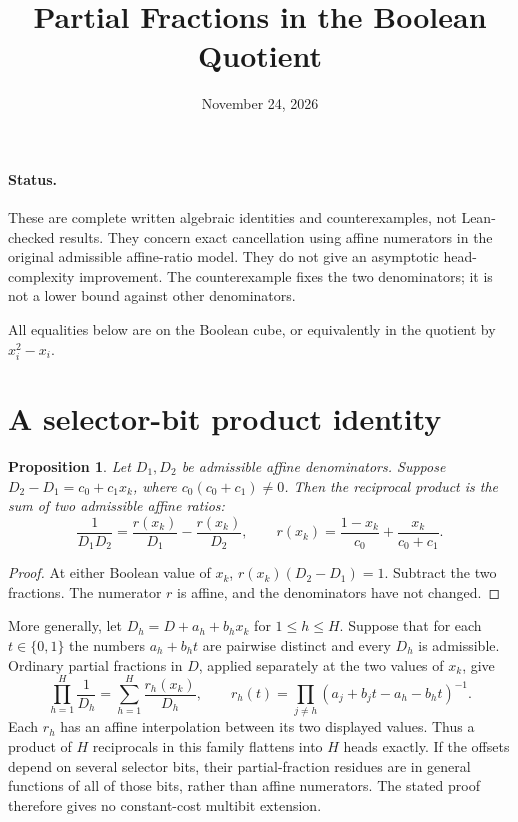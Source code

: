 \documentclass[11pt]{article}
\newtheorem{proposition}[theorem]{Proposition}
\begin{document}
\title{Partial Fractions in the Boolean Quotient}
\author{}
\date{November 24, 2026}
\maketitle

\paragraph{Status.}
These are complete written algebraic identities and counterexamples,
not Lean-checked results. They concern exact cancellation using affine
numerators in the original admissible affine-ratio model. They do not
give an asymptotic head-complexity improvement. The counterexample fixes
the two denominators; it is not a lower bound against other denominators.

All equalities below are on the Boolean cube, or equivalently in the
quotient by $x_i^2-x_i$.

\section{A selector-bit product identity}

\begin{proposition}
Let $D_1,D_2$ be admissible affine denominators. Suppose
$D_2-D_1=c_0+c_1x_k$, where $c_0(c_0+c_1)\ne0$. Then the reciprocal
product is the sum of two admissible affine ratios:
\[
 \frac1{D_1D_2}=\frac{r(x_k)}{D_1}-\frac{r(x_k)}{D_2},\qquad
 r(x_k)=\frac{1-x_k}{c_0}+\frac{x_k}{c_0+c_1}.
\]
\end{proposition}
\begin{proof}
At either Boolean value of $x_k$, $r(x_k)(D_2-D_1)=1$.
Subtract the two fractions. The numerator $r$ is affine, and the
denominators have not changed.
\end{proof}

More generally, let $D_h=D+a_h+b_hx_k$ for $1\le h\le H$.
Suppose that for each $t\in\{0,1\}$ the numbers $a_h+b_ht$ are
pairwise distinct and every $D_h$ is admissible. Ordinary partial
fractions in $D$, applied separately at the two values of $x_k$, give
\[
 \prod_{h=1}^H\frac1{D_h}
 =\sum_{h=1}^H\frac{r_h(x_k)}{D_h},\qquad
 r_h(t)=\prod_{j\ne h}
            (a_j+b_jt-a_h-b_ht)^{-1}.
\]
Each $r_h$ has an affine interpolation between its two displayed
values. Thus a product of $H$ reciprocals in this family flattens
into $H$ heads exactly. If the offsets depend on several selector
bits, their partial-fraction residues are in general functions of
all of those bits, rather than affine numerators. The stated proof
therefore gives no constant-cost multibit extension.
\end{document}
